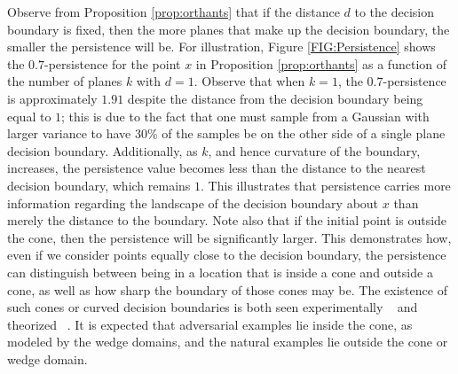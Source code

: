 Observe from Proposition \ref{prop:orthants} that if the distance $d$ to the decision boundary is fixed, then the more planes that make up the decision boundary, the smaller the persistence will be.  For illustration, Figure \ref{FIG:Persistence} shows the $0.7$-persistence for the point $x$ in Proposition \ref{prop:orthants} as a function of the number of planes $k$ with $d=1$. Observe that when $k=1$, the $0.7$-persistence is approximately $1.91$ despite the distance from the decision boundary being equal to $1$; this is due to the fact that one must sample from a Gaussian with larger variance to have 30\% of the samples be on the other side of a single plane decision boundary.  Additionally, as $k$, and hence curvature of the boundary, increases, the persistence value becomes less than the distance to the nearest decision boundary, which remains $1$. This illustrates that persistence carries more information regarding the landscape of the decision boundary about $x$ than merely the distance to the boundary.  Note also that if the initial point is outside the cone, then the persistence will be significantly larger. This demonstrates how, even if we consider points equally close to the decision boundary, the persistence can distinguish between being in a location that is inside a cone and outside a cone, as well as how sharp the boundary of those cones may be. The existence of such cones or curved decision boundaries is both seen experimentally ~\cite{Fawzi2018empirical,roth19aodds} and theorized ~\cite{shamir2021}. It is expected that adversarial examples lie inside the cone, as modeled by the wedge domains, and the natural examples lie outside the cone or wedge domain.


